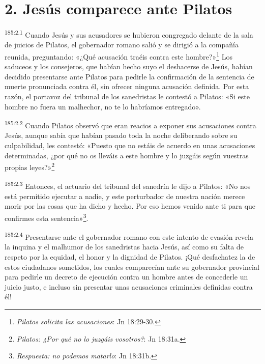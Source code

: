 \section*{2. Jesús comparece ante Pilatos}
\par 
\textsuperscript{185:2.1} Cuando Jesús y sus acusadores se hubieron congregado delante de la sala de juicios de Pilatos, el gobernador romano salió y se dirigió a la compañía reunida, preguntando: «¿Qué acusación traéis contra este hombre?»\footnote{\textit{Pilatos solicita las acusaciones}: Jn 18:29-30.} Los saduceos y los consejeros, que habían hecho suyo el deshacerse de Jesús, habían decidido presentarse ante Pilatos para pedirle la confirmación de la sentencia de muerte pronunciada contra él, sin ofrecer ninguna acusación definida. Por esta razón, el portavoz del tribunal de los sanedristas le contestó a Pilatos: «Si este hombre no fuera un malhechor, no te lo habríamos entregado».

\par 
\textsuperscript{185:2.2} Cuando Pilatos observó que eran reacios a exponer sus acusaciones contra Jesús, aunque sabía que habían pasado toda la noche deliberando sobre su culpabilidad, les contestó: «Puesto que no estáis de acuerdo en unas acusaciones determinadas, ¿por qué no os lleváis a este hombre y lo juzgáis según vuestras propias leyes?»\footnote{\textit{Pilatos: ¿Por qué no lo juzgáis vosotros?}: Jn 18:31a.}

\par 
\textsuperscript{185:2.3} Entonces, el actuario del tribunal del sanedrín le dijo a Pilatos: «No nos está permitido ejecutar a nadie, y este perturbador de nuestra nación merece morir por las cosas que ha dicho y hecho. Por eso hemos venido ante ti para que confirmes esta sentencia»\footnote{\textit{Respuesta: no podemos matarlo}: Jn 18:31b.}.

\par 
\textsuperscript{185:2.4} Presentarse ante el gobernador romano con este intento de evasión revela la inquina y el malhumor de los sanedristas hacia Jesús, así como su falta de respeto por la equidad, el honor y la dignidad de Pilatos. ¡Qué desfachatez la de estos ciudadanos sometidos, los cuales comparecían ante su gobernador provincial para pedirle un decreto de ejecución contra un hombre antes de concederle un juicio justo, e incluso sin presentar unas acusaciones criminales definidas contra él!

